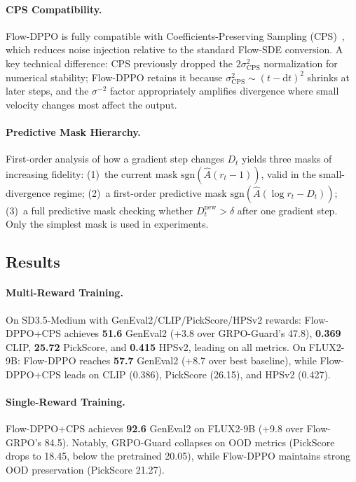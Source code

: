 \documentclass[11pt,a4paper]{article}
\begin{document}
\paragraph{CPS Compatibility.} Flow-DPPO is fully compatible with Coefficients-Preserving Sampling (CPS)~\cite{wang2025cps}, which reduces noise injection relative to the standard Flow-SDE conversion. A key technical difference: CPS previously dropped the $2\sigma_{\mathrm{CPS}}^2$ normalization for numerical stability; Flow-DPPO retains it because $\sigma_{\mathrm{CPS}}^2 \sim (t\!-\!\mathrm{d}t)^2$ shrinks at later steps, and the $\sigma^{-2}$ factor appropriately amplifies divergence where small velocity changes most affect the output.

\paragraph{Predictive Mask Hierarchy.} First-order analysis of how a gradient step changes $D_t$ yields three masks of increasing fidelity: (1)~the current mask $\mathrm{sgn}(\hat{A}(r_t\!-\!1))$, valid in the small-divergence regime; (2)~a first-order predictive mask $\mathrm{sgn}(\hat{A}(\log r_t - D_t))$; (3)~a full predictive mask checking whether $D_t^{\mathrm{new}} > \delta$ after one gradient step. Only the simplest mask is used in experiments.

\subsection{Results}

\paragraph{Multi-Reward Training.} On SD3.5-Medium with GenEval2/CLIP/PickScore/HPSv2 rewards: Flow-DPPO+CPS achieves \textbf{51.6} GenEval2 (+3.8 over GRPO-Guard's 47.8), \textbf{0.369} CLIP, \textbf{25.72} PickScore, and \textbf{0.415} HPSv2, leading on all metrics. On FLUX2-9B: Flow-DPPO reaches \textbf{57.7} GenEval2 (+8.7 over best baseline), while Flow-DPPO+CPS leads on CLIP (0.386), PickScore (26.15), and HPSv2 (0.427).

\paragraph{Single-Reward Training.} Flow-DPPO+CPS achieves \textbf{92.6} GenEval2 on FLUX2-9B (+9.8 over Flow-GRPO's 84.5). Notably, GRPO-Guard collapses on OOD metrics (PickScore drops to 18.45, below the pretrained 20.05), while Flow-DPPO maintains strong OOD preservation (PickScore 21.27).
\end{document}
